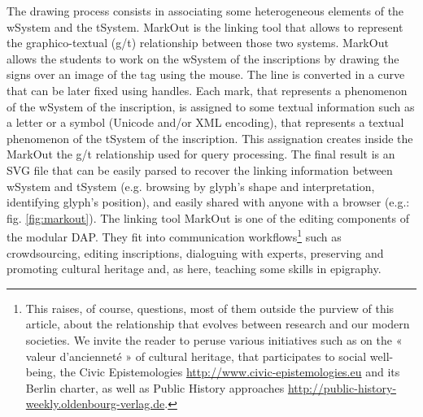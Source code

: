 \documentclass[amsthm,ebook]{saparticle}
\begin{document}
The drawing process consists in associating some heterogeneous elements of the wSystem and the tSystem. MarkOut is the
linking tool that allows to represent the graphico-textual (g/t) relationship between those two systems. MarkOut allows
the students to work on the wSystem of the inscriptions by drawing the signs over an image of the tag using the mouse.
The line is converted in a curve that can be later fixed using handles. Each mark, that represents a phenomenon of the
wSystem of the inscription, is assigned to some textual information such as a letter or a symbol (Unicode and/or XML
encoding), that represents a textual phenomenon of the tSystem of the inscription. This assignation creates inside the
MarkOut the g/t relationship used for query processing. The final result is an SVG file that can be easily parsed to
recover the linking information between wSystem and tSystem (e.g. browsing by glyph's shape and interpretation,
identifying glyph's position), and easily shared with anyone with a browser (e.g.: fig. \ref{fig:markout}). The linking tool MarkOut
is one of the editing components of the modular DAP. They fit into communication workflows\footnote{This raises, of
course, questions, most of them outside the purview of this article, about the relationship that evolves between
research and our modern societies. We invite the reader to peruse various initiatives such as \citet{bertocci_documenter_2006} on the «
valeur d'ancienneté » of cultural heritage, that participates to social well-being, the Civic Epistemologies
\url{http://www.civic-epistemologies.eu} and its Berlin charter, as well as Public History approaches
\url{http://public-history-weekly.oldenbourg-verlag.de}.} such as crowdsourcing, editing inscriptions, dialoguing with
experts, preserving and promoting cultural heritage and, as here, teaching some skills in epigraphy.
\end{document}
